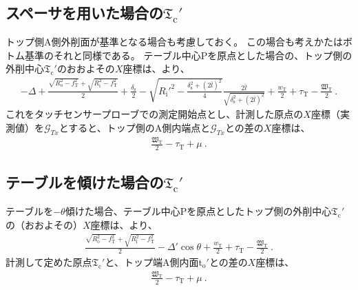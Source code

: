 \subsection[スペーサを用いた場合の\texorpdfstring{$\mathfrak T_\mathrm c'$}{Tc'}]
           {スペーサを用いた場合の$\boldsymbol{\mathfrak T_\mathrm c'}$}
トップ側A側外削面が基準となる場合も考慮しておく。
この場合も考えかたはボトム基準のそれと同様である。
テーブル中心Pを原点とした場合の、トップ側の外削中心$\mathfrak T_\mathrm c'$のおおよその$X$座標は、より、
\begin{align*}
  -\Delta+\frac{\sqrt{R_\mathrm o^2-f_\mathrm T^2}+\sqrt{R_\mathrm i^2-f_\mathrm T^2}}2+\frac{\delta_\mathrm s}2
  -\sqrt{R_\mathrm i'^2-\frac{\delta_\mathrm s^2+(2\bar l)^2}4}\frac{2\bar l}{\sqrt{\delta_\mathrm s^2+(2\bar l)^2}}
  +\frac{w_\mathrm T}2+\tau_\mathrm T-\frac{\mathfrak W_\mathrm T}2\ .
\end{align*}
これをタッチセンサープローブでの測定開始点とし、計測した原点の$X$座標（実測値）を$\mathcal G_{Tx}$とすると、トップ側のA側内端点と$\mathcal G_{Tx}$との差の$X$座標は、
\begin{align*}
  \frac{\mathfrak W_\mathrm T}2-\tau_\mathrm T+\mu~.
\end{align*}


\subsection[テーブルを傾けた場合の\texorpdfstring{$\mathfrak T_\mathrm c'$}{Tc'}]
           {テーブルを傾けた場合の$\boldsymbol{\mathfrak T_\mathrm c'}$}
テーブルを$-\theta$傾けた場合、テーブル中心Pを原点としたトップ側の外削中心$\mathfrak T_\mathrm c'$の（おおよその）$X$座標は、より、
\begin{align}
  \label{eq:gaisakucenterTt}
  \frac{\sqrt{R_\mathrm o^2-f_\mathrm T^2}+\sqrt{R_\mathrm i^2-f_\mathrm T^2}}2-\Delta'\cos\theta
  +\frac{w_\mathrm T}2+\tau_\mathrm T-\frac{\mathfrak W_\mathrm T}2\ .
\end{align}
計測して定めた原点$\mathfrak T_\mathrm c'$と、トップ端A側内面t$_\mathrm o'$との差の$X$座標は、
\begin{align}
  \label{eq:gaisakucenterTr}
  \frac{\mathfrak W_\mathrm T}2-\tau_\mathrm T+\mu~.
\end{align}


